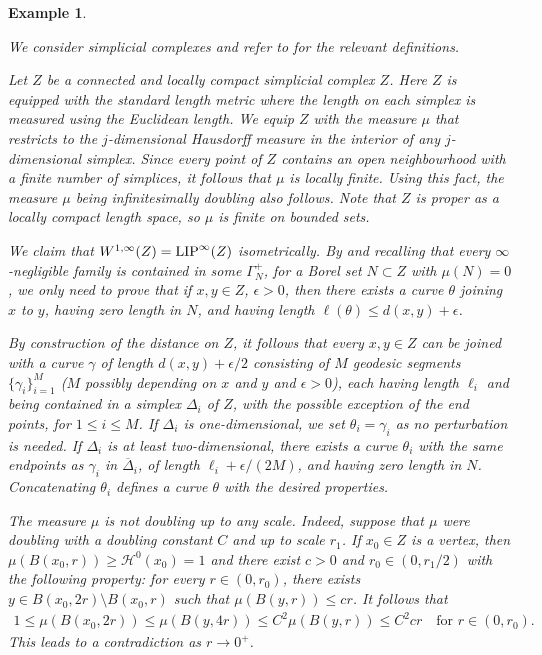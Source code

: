 \documentclass[reqno]{amsart}
\newcommand{\LIP}{{\rm LIP}}
\numberwithin{equation}{section}
\newtheorem{example}[theorem]{Example}
\theoremstyle{remark}
\begin{document}
\begin{example}\label{ex:CAT(0)}
{\em We consider simplicial complexes and refer to \cite[Section 7]{Cavallucci:Sambusetti:2022} for the relevant definitions.

Let $Z$ be a connected and locally compact simplicial complex $Z$. Here $Z$ is equipped with the standard length metric where the length on each simplex is measured using the Euclidean length. We equip $Z$ with the measure $\mu$ that restricts to the $j$-dimensional Hausdorff measure in the interior of any $j$-dimensional simplex. Since every point of $Z$ contains an open neighbourhood with a finite number of simplices, it follows that $\mu$ is locally finite. Using this fact, the measure $\mu$ being infinitesimally doubling also follows. Note that $Z$ is proper as a locally compact length space, so $\mu$ is finite on bounded sets.

We claim that $W^{1,\infty}(Z) = \LIP^{\infty}(Z)$ isometrically. By  and recalling that every $\infty$-negligible family is contained in some $\Gamma^{+}_{N}$, for a Borel set $N \subset Z$ with $\mu(N) = 0$, we only need to prove that if $x, y \in Z$, $\epsilon > 0$, then there exists a curve $\theta$ joining $x$ to $y$, having zero length in $N$, and having length $\ell( \theta )\leq d(x,y) + \epsilon$.

By construction of the distance on $Z$, it follows that every $x, y \in Z$ can be joined with a curve $\gamma$ of length $d(x,y) + \epsilon/2$ consisting of $M$ geodesic segments $\{\gamma_i\}^{M}_{i=1} $ ($M$ possibly depending on $x$ and $y$ and $\epsilon >0$), each having length $\ell_i$ and being contained in a simplex $\Delta_i$ of $Z$, with the possible exception of the end points, for $1 \leq i \leq M$. If $\Delta_i$ is one-dimensional, we set $\theta_i = \gamma_i$ as no perturbation is needed. If $\Delta_i$ is at least two-dimensional, there exists a curve $\theta_i$ with the same endpoints as $\gamma_i$ in $\overline{\Delta}_i$, of length $\ell_i + \epsilon/(2M)$, and having zero length in $N$. Concatenating $\theta_i$ defines a curve $\theta$ with the desired properties.

The measure $\mu$ is not doubling up to any scale. Indeed, suppose that $\mu$ were doubling with a doubling constant $C$ and up to scale $r_1$. If $x_0 \in Z$ is a vertex, then $\mu( B(x_0,r) ) \geq \mathcal H^0(x_0)=1$ and there exist $c > 0$ and $r_0 \in (0,r_1/2)$ with the following property: for every $r \in (0,r_0)$, there exists $y \in B( x_0, 2r ) \setminus B( x_0, r )$ such that $\mu( B( y, r ) ) \leq c r$. It follows that
\begin{align*}
    1 \leq \mu( B( x_0, 2r ) ) \leq \mu( B( y, 4r ) ) \leq C^2 \mu( B( y, r ) ) \leq C^2 c r
    \quad\text{for $r \in (0,r_0)$.}
\end{align*}
This leads to a contradiction as $r \rightarrow 0^{+}$.

}
\end{example}
\end{document}
